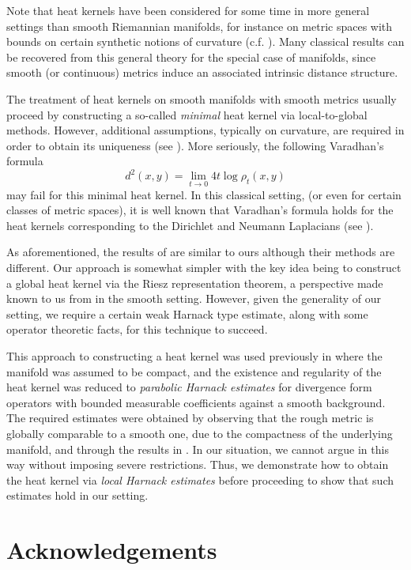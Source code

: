 \documentclass[a4paper, 12pt]{amsart}
\numberwithin{equation}{section}
\renewcommand{\~}{\tilde}
\renewcommand{\-}{\bar}
\newcommand{\8}{\infty}
\newcommand{\hk}{\rho}
\begin{document}
Note that heat kernels have been considered
for some time in more general settings than smooth Riemannian manifolds,
for instance on metric spaces with bounds
on certain synthetic notions of curvature (c.f. \cite{Sturm}).
Many classical results can be recovered from this general 
theory for the special case of manifolds, 
since smooth (or continuous) metrics induce an associated intrinsic
distance structure. 

The treatment of heat kernels on smooth manifolds with smooth metrics 
usually proceed by constructing
a so-called \emph{minimal} heat kernel via local-to-global methods.
However, additional assumptions, typically on curvature,
are required in order to obtain its uniqueness  (see \cite{Chavel}).
More seriously, the following Varadhan's formula
$$ d^2(x,y) = \lim_{t \to 0} 4 t \log \hk_t(x,y)$$
may fail for this minimal heat kernel. 
In this classical setting, (or even for certain classes of 
metric spaces), it is well known that Varadhan's formula holds for the heat 
kernels corresponding to the Dirichlet and Neumann Laplacians 
(see  \cite{Norris, ERS}).

As aforementioned, the results of \cite{Norris, ERS} 
are similar to ours although their methods are different. 
Our approach is somewhat simpler with the key 
idea being to construct a global heat kernel
via the Riesz representation theorem, a perspective made known to us from 
\cite{Davies} in the smooth setting. However, given the generality of our setting,
 we require a certain 
weak Harnack type estimate, along with 
some operator theoretic facts, for this technique to succeed.

This approach to constructing a heat kernel was used previously in  
\cite{BCont} where the manifold was assumed to be compact,  and 
the existence and regularity of the heat kernel was
reduced to \emph{parabolic Harnack estimates} for divergence form operators
with bounded measurable coefficients against a smooth background. 
The required estimates
were obtained by observing that  
the rough metric is globally comparable to a smooth one,
due to the compactness of the underlying manifold, and
through the  results  in \cite{SC}.
In our situation,  we cannot argue in this way without imposing
severe restrictions. Thus, we demonstrate
how to obtain the heat kernel via \emph{local Harnack estimates} 
before proceeding to show that such estimates 
hold in our setting.

\section*{Acknowledgements}
\end{document}
